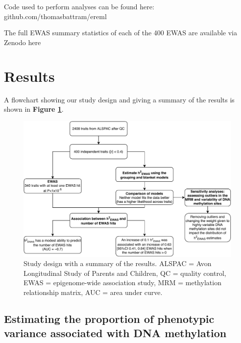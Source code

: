 \documentclass[11pt,oneside]{bristolthesis}
\begin{document}
Code used to perform analyses can be found here: github.com/thomasbattram/ereml

The full EWAS summary statistics of each of the 400 EWAS are available via Zenodo here

\hypertarget{results-05}{%
\section{Results}\label{results-05}}

A flowchart showing our study design and giving a summary of the results is shown in \textbf{Figure \ref{fig:h2ewas-study-design}}.


\begin{figure}

{\centering \includegraphics[width=1\linewidth]{figure/05-h2ewas/m2_workflow} 

}

\caption{Study design with a summary of the results. ALSPAC = Avon Longitudinal Study of Parents and Children, QC = quality control, EWAS = epigenome-wide association study, MRM = methylation relationship matrix, AUC = area under curve.}\label{fig:h2ewas-study-design}
\end{figure}
\hypertarget{estimating-h2ewas}{%
\subsection{Estimating the proportion of phenotypic variance associated with DNA methylation}\label{estimating-h2ewas}}
\end{document}
